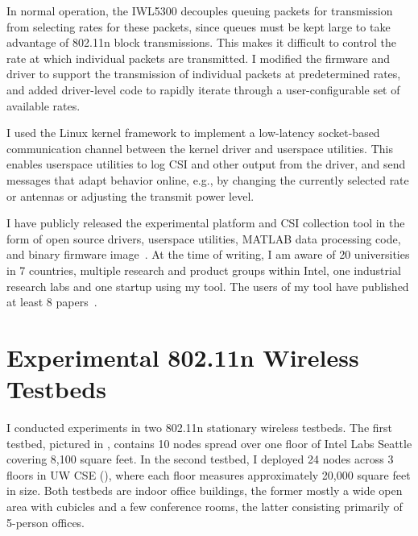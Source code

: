  In normal operation, the IWL5300 decouples queuing packets for transmission from selecting rates for these packets, since queues must be kept large to take advantage of 802.11n block transmissions. This makes it difficult to control the rate at which individual packets are transmitted. I modified the firmware and driver to support the transmission of individual packets at predetermined rates, and added driver-level code to rapidly iterate through a user-configurable set of available rates.

 I used the Linux kernel  framework to implement a low-latency socket-based communication channel between the kernel driver and userspace utilities. This enables userspace utilities to log CSI and other output from the driver, and send messages that adapt behavior online, e.g., by changing the currently selected rate or antennas or adjusting the transmit power level.

 I have publicly released the experimental platform and CSI collection tool in the form of open source drivers, userspace utilities, MATLAB data processing code, and binary firmware image~\cite{Halperin_csitool}. At the time of writing, I am aware of 20 universities in 7 countries, multiple research and product groups within Intel, one industrial research labs and one startup using my tool. The users of my tool have published at least 8 papers~\cite{Bhartia_FreqDiv,Crepaldi_CSI_SF,Gong_MuMIMO,Perahia_Doppler,Sen_SpinLoc,Sen_PinLoc,Wu_FILA}.

\section{Experimental 802.11n Wireless Testbeds}
I conducted experiments in two 802.11n stationary wireless testbeds. The first testbed, pictured in , contains 10 nodes spread over one floor of Intel Labs Seattle covering 8,100 square feet. In the second testbed, I deployed 24 nodes across 3 floors in UW CSE (), where each floor measures approximately 20,000 square feet in size. Both testbeds are indoor office buildings, the former mostly a wide open area with cubicles and a few conference rooms, the latter consisting primarily of 5-person offices.

